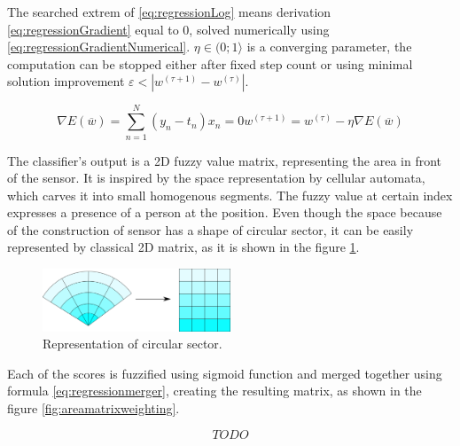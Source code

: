 The searched extrem of \ref{eq:regressionLog} means derivation \ref{eq:regressionGradient}
equal to $0$, solved numerically using \ref{eq:regressionGradientNumerical}.
$\eta \in (0;1\rangle$ is a converging parameter, the computation can be stopped either after
fixed step count or using minimal solution improvement $\varepsilon < | w^{(\tau + 1)} - w^{(\tau)} |$.

\begin{subequations}
\begin{equation}
\nabla E(\overline{w}) = \sum_{n=1}^N (y_n - t_n)x_n = 0
\label{eq:regressionGradient}
\end{equation}
\begin{equation}
w^{(\tau + 1)} = w^{(\tau)} - \eta \nabla E(\overline{w})
\label{eq:regressionGradientNumerical}
\end{equation}
\end{subequations}

The classifier's output is a 2D fuzzy value matrix, representing the area in front of the sensor.
It is inspired by the space representation by cellular automata, which carves it into small
homogenous segments. The fuzzy value at certain index expresses a presence of a person
at the position. Even though the space because of the construction of sensor has a shape of
circular sector, it can be easily represented by classical 2D matrix, as it is shown in the figure \ref{fig:circularsector}.

\begin{figure}[h!]
\begin{center}
\includegraphics[width=0.5\textwidth]{img/circularsector_transformation.png}
\caption{Representation of circular sector.\label{fig:circularsector}}
\end{center}
\end{figure}

Each of the scores is fuzzified using sigmoid function and merged together using formula \ref{eq:regressionmerger},
creating the resulting matrix, as shown in the figure \ref{fig:areamatrixweighting}.

\begin{equation}
TODO
\label{eq:regressionmerger}
\end{equation}

